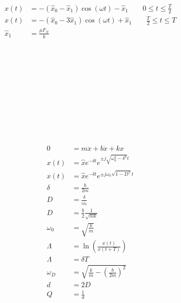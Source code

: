 \begin{boxleft}
\\
\\
\\
\\
\end{boxleft}\begin{boxrightshaded}
\begin{align*}
x(t)&=-(\hat{x}_0-\hat{x}_1)\cos(\omega t)-\hat{x}_1\qquad 0\leq t\leq \frac{T}{2}\\
x(t)&=-(\hat{x}_0-3\hat{x}_1)\cos(\omega t)+\hat{x}_1\qquad \frac{T}{2}\leq t\leq T\\
\hat{x}_1&=\frac{\mu F_N}{k}
\end{align*}
\end{boxrightshaded}

\begin{boxleft}
\\
\\
\\
\\
\\
\\
\\
\\
\\
\end{boxleft}\begin{boxrightshaded}
\begin{align*}
0&=m\ddot{x}+b\dot{x}+kx\\
x(t)&=\hat{x}e^{-\delta t}e^{\pm j\sqrt{\omega_0^2-\delta^2}t}\\
x(t)&=\hat{x}e^{-\delta t}e^{\pm j\omega_0\sqrt{1-D^2}t}\\
\delta&=\frac{b}{2m}\\
D&=\frac{\delta}{\omega_0}\\
D&=\frac{b}{2}\frac{1}{\sqrt{mk}}\\
\omega_0&=\sqrt{\frac{k}{m}}\\
\Lambda&=\ln\left(\frac{x(t)}{x(t+T)}\right)\\
\Lambda&=\delta T\\
\omega_D&=\sqrt{\frac{k}{m}-\left(\frac{b}{2m}\right)^2}\\
d&=2D\\
Q&=\frac{1}{d}
\end{align*}
\end{boxrightshaded}

